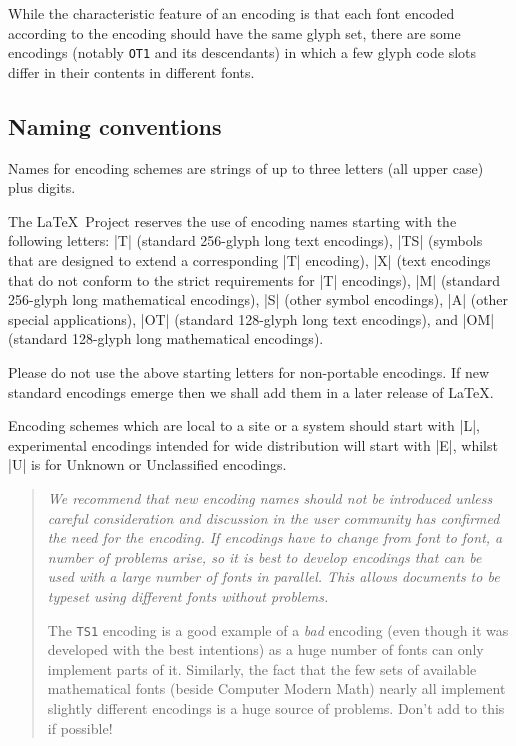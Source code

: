 \documentclass{ltxguide}[1994/11/20]
\providecommand{\Enc}[1]{\texttt{#1}}
\begin{document}
While the characteristic feature of an encoding is that each font
encoded according to the encoding should have the same glyph set,
there are some encodings (notably \Enc{OT1} and its descendants) in
which a few glyph code slots differ in their contents in different
fonts.

\subsection{Naming conventions}

Names for encoding schemes are strings of up to three letters (all
upper case) plus digits.

The \LaTeX\ Project reserves the use of encoding names starting with the
following letters: |T| (standard 256-glyph long text encodings), |TS|
(symbols that are designed to extend a corresponding |T| encoding),
|X| (text encodings that do not conform to the strict requirements for
|T| encodings), |M| (standard 256-glyph long mathematical encodings), |S| (other
symbol encodings), |A| (other special applications), |OT| (standard
128-glyph long text encodings), and |OM| (standard 128-glyph long mathematical encodings).

Please do not use the above starting letters for non-portable
encodings. If new standard encodings emerge then we shall add them in
a later release of \LaTeX.

Encoding schemes which are local to a site or a system should start
with |L|, experimental encodings intended for wide distribution will
start with |E|, whilst |U| is for Unknown or Unclassified encodings.

\begin{quote}
  \itshape We recommend that new encoding names should not be
  introduced unless careful consideration and discussion in the user
  community has confirmed the need for the encoding. If encodings have to
  change from font to font, a number of problems arise, so it is best to
  develop encodings that can be used with a large number of fonts in parallel.
  This allows documents to be typeset using different fonts without problems.

  The \Enc{TS1} encoding is a good example of a \emph{bad} encoding (even
  though it was developed with the best intentions) as a huge number of fonts
  can only implement parts of it. Similarly, the fact that the few sets of
  available mathematical fonts (beside Computer Modern Math) nearly
  all implement slightly different encodings is a huge source of
  problems. Don't add to this if possible!
\end{quote}
\end{document}
